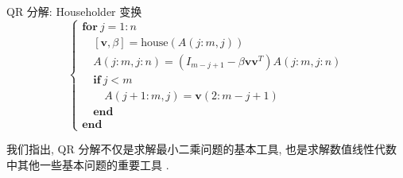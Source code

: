 \begin{algorithm}{QR 分解: Householder 变换}
\label{alg:4-2}
\[
  \left\{
  \begin{array}{l}
    \textbf{for}\ j=1:n\\
    \quad[\mathbf{v},\beta]=\text{house}(A(j:m,j))\\
    \quad A(j:m,j:n)=(I_{m-j+1}-\beta\mathbf{v}\mathbf{v}^T)A(j:m,j:n)\\
    \quad\textbf{if}\ j<m\\
    \quad\quad A(j+1:m,j)=\mathbf{v}(2:m-j+1)\\
    \quad\textbf{end}\\
    \textbf{end}
  \end{array}
  \right.
\]
\end{algorithm}

我们指出, QR 分解不仅是求解最小二乘问题的基本工具, 也是求解数值线性代数中其他一些基本问题的重要工具 \cite{src:20,src:23,src:24}.

